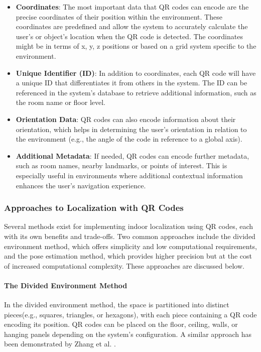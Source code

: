 \begin{itemize}
	\item \textbf{Coordinates}: The most important data that QR codes can encode are the precise coordinates of their position within the environment. These coordinates are predefined and allow the system to accurately calculate the user’s or object’s location when the QR code is detected. The coordinates might be in terms of x, y, z positions or based on a grid system specific to the environment.
	
	\item \textbf{Unique Identifier (ID)}: In addition to coordinates, each QR code will have a unique ID that differentiates it from others in the system. The ID can be referenced in the system’s database to retrieve additional information, such as the room name or floor level.
	
	\item \textbf{Orientation Data}: QR codes can also encode information about their orientation, which helps in determining the user’s orientation in relation to the environment (e.g., the angle of the code in reference to a global axis).
	
	\item \textbf{Additional Metadata}: If needed, QR codes can encode further metadata, such as room names, nearby landmarks, or points of interest. This is especially useful in environments where additional contextual information enhances the user’s navigation experience.
\end{itemize}

\subsubsection{Approaches to Localization with QR Codes}

Several methods exist for implementing indoor localization using QR codes, each with its own benefits and trade-offs. Two common approaches include the divided environment method, which offers simplicity and low computational requirements, and the pose estimation method, which provides higher precision but at the cost of increased computational complexity. These approaches are discussed below.

\paragraph{The Divided Environment Method}

In the divided environment method, the space is partitioned into distinct pieces(e.g., squares, triangles, or hexagons), with each piece containing a QR code encoding its position. QR codes can be placed on the floor, ceiling, walls, or hanging panels depending on the system's configuration. A similar approach has been demonstrated by Zhang et al. \cite{zhang2015}.

